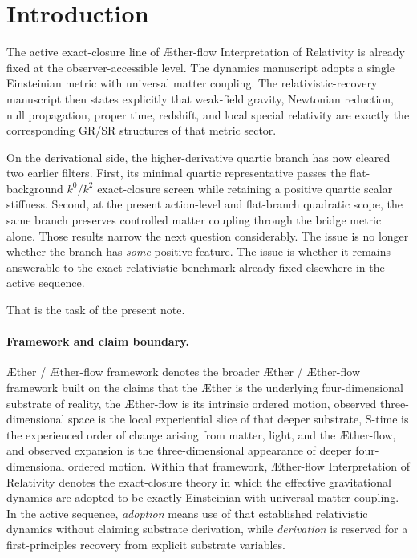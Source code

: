 \documentclass[11pt]{article}
\newcommand{\Aether}{\AE{}ther}
\newcommand{\Aflow}{\AE{}ther-flow}
\newcommand{\TheoryName}{\Aflow{} Interpretation of Relativity}
\newcommand{\TheoryProgram}{\Aether{} / \Aflow{} framework}
\begin{document}
\section{Introduction}

The active exact-closure line of \TheoryName{} is already fixed at the observer-accessible level. The dynamics manuscript adopts a single Einsteinian metric with universal matter coupling. The relativistic-recovery manuscript then states explicitly that weak-field gravity, Newtonian reduction, null propagation, proper time, redshift, and local special relativity are exactly the corresponding GR/SR structures of that metric sector.

On the derivational side, the higher-derivative quartic branch has now cleared two earlier filters. First, its minimal quartic representative passes the flat-background \(k^0/k^2\) exact-closure screen while retaining a positive quartic scalar stiffness. Second, at the present action-level and flat-branch quadratic scope, the same branch preserves controlled matter coupling through the bridge metric alone. Those results narrow the next question considerably. The issue is no longer whether the branch has \emph{some} positive feature. The issue is whether it remains answerable to the exact relativistic benchmark already fixed elsewhere in the active sequence.

That is the task of the present note.

\paragraph{Framework and claim boundary.}
\TheoryProgram{} denotes the broader \Aether{} / \Aflow{} framework built on the claims that the \Aether{} is the underlying four-dimensional substrate of reality, the \Aflow{} is its intrinsic ordered motion, observed three-dimensional space is the local experiential slice of that deeper substrate, S-time is the experienced order of change arising from matter, light, and the \Aflow{}, and observed expansion is the three-dimensional appearance of deeper four-dimensional ordered motion. Within that framework, \TheoryName{} denotes the exact-closure theory in which the effective gravitational dynamics are adopted to be exactly Einsteinian with universal matter coupling. In the active sequence, \emph{adoption} means use of that established relativistic dynamics without claiming substrate derivation, while \emph{derivation} is reserved for a first-principles recovery from explicit substrate variables.
\end{document}
